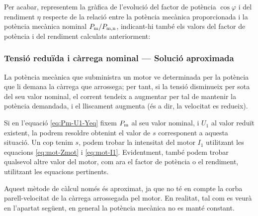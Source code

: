 \begin{exemple}
	Per acabar, representem  la gràfica de l'evolució del factor de potència $\cos\varphi$ i del rendiment $\eta$  respecte de la relació entre la potència mecànica proporcionada i la potència mecànica nominal $P_\mathrm{m}/P_\mathrm{m,n}$, indicant-hi també els valors del factor de potència i del rendiment calculats anteriorment:
	\begin{center}
		
	\end{center}

\end{exemple}
	
\subsubsection{Tensió reduïda i càrrega nominal --- Solució aproximada}

La potència mecànica que subministra un motor ve determinada per la potència que li demana la càrrega que arrossega; per tant, si la tensió disminueix per sota del seu valor nominal, el corrent tendeix a augmentar per tal de mantenir la potència demandada, i el lliscament augmenta (és a dir, la velocitat es redueix).

Si en l'equació \eqref{eq:Pm-U1-Yeq} fixem $P_\mathrm{m}$ al seu valor nominal, i $U_1$ al valor reduït existent, la podrem resoldre obtenint el valor de $s$ corresponent  a aquesta situació. Un cop tenim $s$, podem trobar la intensitat del motor $I_1$ utilitzant les equacions \eqref{eq:mot-Zmot} i \eqref{eq:mot-I1}. Evidentment, també podem trobar qualsevol altre valor del motor, com  ara el factor de potència o el rendiment, utilitzant les equacions pertinents.

Aquest mètode de càlcul només és aproximat, ja que no té en compte la corba parell-velocitat de la càrrega arrossegada pel motor. En realitat, tal com es veurà en l'apartat següent, en general la potència mecànica no es manté constant.

